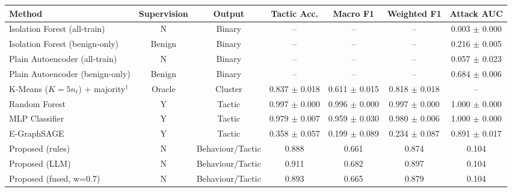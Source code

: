\begin{tabular}{lcccccc}
\toprule
Method & Supervision & Output & Tactic Acc. & Macro F1 & Weighted F1 & Attack AUC \\
\midrule
Isolation Forest (all-train) & N & Binary & -- & -- & -- & 0.003 $\pm$ 0.000 \\
Isolation Forest (benign-only) & Benign & Binary & -- & -- & -- & 0.216 $\pm$ 0.005 \\
Plain Autoencoder (all-train) & N & Binary & -- & -- & -- & 0.057 $\pm$ 0.023 \\
Plain Autoencoder (benign-only) & Benign & Binary & -- & -- & -- & 0.684 $\pm$ 0.006 \\
K-Means ($K=5n_t$) + majority$^\dagger$ & Oracle & Cluster & 0.837 $\pm$ 0.018 & 0.611 $\pm$ 0.015 & 0.818 $\pm$ 0.018 & -- \\
Random Forest & Y & Tactic & 0.997 $\pm$ 0.000 & 0.996 $\pm$ 0.000 & 0.997 $\pm$ 0.000 & 1.000 $\pm$ 0.000 \\
MLP Classifier & Y & Tactic & 0.979 $\pm$ 0.007 & 0.959 $\pm$ 0.030 & 0.980 $\pm$ 0.006 & 1.000 $\pm$ 0.000 \\
E-GraphSAGE & Y & Tactic & 0.358 $\pm$ 0.057 & 0.199 $\pm$ 0.089 & 0.234 $\pm$ 0.087 & 0.891 $\pm$ 0.017 \\
Proposed (rules) & N & Behaviour/Tactic & 0.888 & 0.661 & 0.874 & 0.104 \\
Proposed (LLM) & N & Behaviour/Tactic & 0.911 & 0.682 & 0.897 & 0.104 \\
Proposed (fused, w=0.7) & N & Behaviour/Tactic & 0.893 & 0.665 & 0.879 & 0.104 \\
\bottomrule
\end{tabular}
